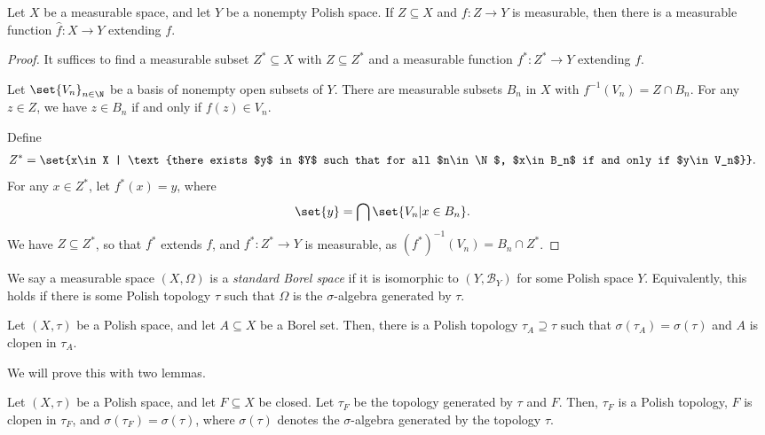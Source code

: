 \documentclass[10pt]{mypackage}
\begin{document}
\begin{theorem}
  Let $X$ be a measurable space, and let $Y$ be a nonempty Polish space. If $Z\subseteq X$ and $f\colon Z\rightarrow Y$ is measurable, then there is a measurable function $\hat{f}\colon X\rightarrow Y$ extending $f$.
\end{theorem}
\begin{proof}
  It suffices to find a measurable subset $Z^{\ast}\subseteq X$ with $Z\subseteq Z^{\ast}$ and a measurable function $f^{\ast}\colon Z^{\ast}\rightarrow Y$ extending $f$.

  Let $\set{V_n}_{n\in \N}$ be a basis of nonempty open subsets of $Y$. There are measurable subsets $B_n$ in $X$ with $f^{-1}\left( V_n \right) = Z\cap B_n$. For any $z\in Z$, we have $z\in B_n$ if and only if $f(z)\in V_n$.

  Define
  \begin{align*}
    Z^{\ast} &= \set{x\in X | \text{there exists $y$ in $Y$ such that for all $n\in \N$, $x\in B_n$ if and only if $y\in V_n$}}.
  \end{align*}
  For any $x\in Z^{\ast}$, let $f^{\ast}(x) = y$, where
  \begin{align*}
    \set{y} &= \bigcap\set{V_n | x\in B_n}.
  \end{align*}
  We have $Z\subseteq Z^{\ast}$, so that $f^{\ast}$ extends $f$, and $f^{\ast}\colon Z^{\ast}\rightarrow Y$ is measurable, as $ \left( f^{\ast} \right)^{-1}\left( V_n \right) = B_n\cap Z^{\ast} $.
\end{proof}
\begin{definition}
  We say a measurable space $\left( X,\Omega \right)$ is a \textit{standard Borel space} if it is isomorphic to $\left( Y,\mathcal{B}_Y \right)$ for some Polish space $Y$. Equivalently, this holds if there is some Polish topology $\tau$ such that $\Omega$ is the $\sigma$-algebra generated by $\tau$.
\end{definition}
\begin{theorem}
  Let $\left( X,\tau \right)$ be a Polish space, and let $A\subseteq X$ be a Borel set. Then, there is a Polish topology $\tau_A\supseteq \tau$ such that $\sigma\left( \tau_A \right) = \sigma\left( \tau \right)$ and $A$ is clopen in $\tau_A$.
\end{theorem}
We will prove this with two lemmas.
\begin{lemma}
  Let $\left( X,\tau \right)$ be a Polish space, and let $F\subseteq X$ be closed. Let $\tau_F$ be the topology generated by $\tau$ and $F$. Then, $\tau_F$ is a Polish topology, $F$ is clopen in $\tau_F$, and $\sigma\left( \tau_F \right) = \sigma\left( \tau \right)$, where $\sigma\left( \tau \right)$ denotes the $\sigma$-algebra generated by the topology $\tau$.
\end{lemma}
\end{document}
